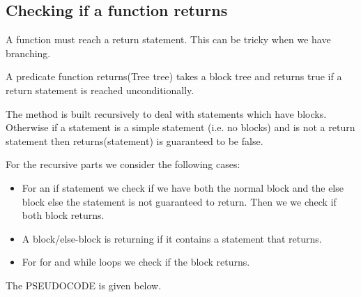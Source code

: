 \subsection{Checking if a function returns}
A function must reach a return statement. This can be tricky when we have branching.

A predicate function returns(Tree tree) takes a block tree and returns true if a return statement is reached unconditionally.

The method is built recursively to deal with statements which have blocks. Otherwise if a statement is a simple statement (i.e. no blocks) and is not a return statement then returns(statement) is guaranteed to be false.

For the recursive parts we consider the following cases:
\begin{itemize}
	\item For an if statement we check if we have both the normal block and the else block else the statement is not guaranteed to return. Then we we check if both block returns.
	\item A block/else-block is returning if it contains a statement that returns.
	\item For for and while loops we check if the block returns.
\end{itemize}


The PSEUDOCODE is given below.

